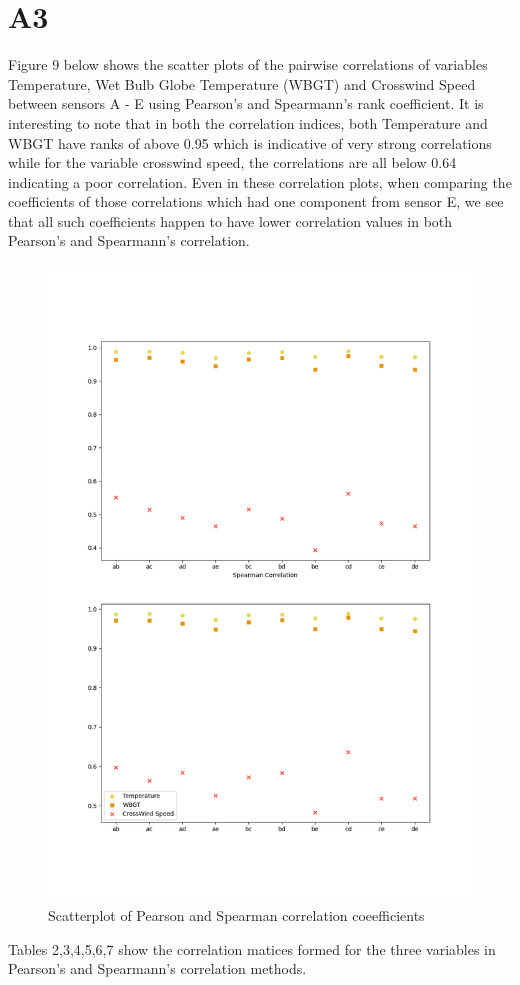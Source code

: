 \documentclass[a4paper]{article}
\begin{document}
\section{A3}
Figure 9 below shows the scatter plots of the pairwise correlations of variables Temperature, Wet Bulb Globe Temperature (WBGT) and Crosswind Speed between sensors A - E using Pearson's and Spearmann's rank coefficient. It is interesting to note that in both the correlation indices, both Temperature and WBGT have ranks of above 0.95 which is indicative of very strong correlations while for the variable crosswind speed, the correlations are all below 0.64 indicating a poor correlation. Even in these correlation plots, when comparing the coefficients of those correlations which had one component from sensor E, we see that all such coefficients happen to have lower correlation values in both Pearson's and Spearmann's correlation.
\begin{figure}[H]
\includegraphics[width=12cm]{images/a3.png}
\centering
\caption{Scatterplot of Pearson and Spearman correlation coeefficients }
\end{figure}
Tables 2,3,4,5,6,7 show the correlation matices formed for the three variables in Pearson's and Spearmann's correlation methods.
\end{document}
